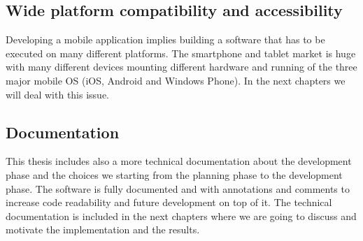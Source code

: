 \subsection{Wide platform compatibility and accessibility}
Developing a mobile application implies building a software that has to be executed on many different platforms. The smartphone and tablet market is huge with many different devices mounting different hardware and running of the three major mobile OS (iOS, Android and Windows Phone). In the next chapters we will deal with this issue.   

\subsection{Documentation}
This thesis includes also a more technical documentation about the development phase and the choices we starting from the planning phase to the development phase. The software is fully documented and with annotations and comments to increase code readability and future development on top of it. The technical documentation is included in the next chapters where we are going to discuss and motivate the implementation and the results.